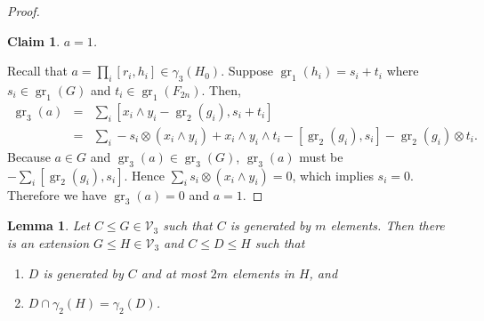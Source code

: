 \documentclass[11pt,reqno]{article}
\newtheorem{lemma}[theorem]{Lemma}
\newtheorem{claim}{Claim}[theorem]
\theoremstyle{definition}
\theoremstyle{remark}
\DeclareMathOperator{\gr}{gr}
\begin{document}
\begin{proof}
    \begin{claim}
        $a=1$.
    \end{claim}
    Recall that $a=\prod_i [r_i,h_i]\in \gamma_3(H_0)$.
    Suppose $\gr_1(h_i)=s_i+ t_i$ where $s_i\in \gr_1(G)$ and $t_i\in \gr_1(F_{2n})$.
    Then, 
    \begin{eqnarray*}
        \gr_3(a) 
        &=& \sum_i [x_i\wedge y_i-\gr_2(g_i),s_i+t_i]\\ 
        &=& \sum_i -s_i\otimes(x_i\wedge y_i) + x_i\wedge y_i\wedge t_i - [\gr_2(g_i),s_i] - \gr_2(g_i)\otimes t_i.
    \end{eqnarray*}
    Because $a\in G$ and $\gr_3(a)\in\gr_3(G)$,
    $\gr_3(a)$ must be $-\sum_i[\gr_2(g_i),s_i]$. Hence $\sum_i s_i\otimes (x_i\wedge y_i)=0$, which implies $s_i=0$.
    Therefore we have $\gr_3(a)=0$ and $a=1$.
\end{proof}


\begin{lemma}\label{lemma:commutator root}
Let $C\leq G\in \mathcal V_3$ such that $C$ is generated by $m$ elements. Then there is an extension $G\leq H\in \mathcal V_3$ and $C\leq D \leq H$ such that
\begin{enumerate}
    \item $D$ is generated by $C$ and at most $2m$ elements in $H$, and
    \item $D\cap \gamma_2(H)= \gamma_2(D)$.
\end{enumerate}    
\end{lemma}
\end{document}
